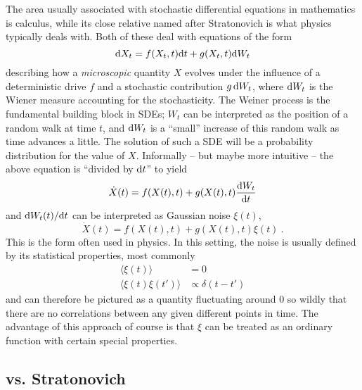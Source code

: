 The area usually associated with stochastic differential equations in mathematics is \Ito{} calculus, while its close relative named after Stratonovich is what physics typically deals with. Both of these deal with equations of the form
%
\begin{equation}
	\label{eqn:sde}
	\mathrm{d} X_t = f(X_t,t) \mathrm{d} t + g(X_t,t) \mathrm{d} W_t
\end{equation}
%
describing how a \emph{microscopic} quantity \(X\) evolves under the influence of a deterministic drive \(f\) and a stochastic contribution \(g\,\mathrm{d} W_t\), where \(\mathrm{d} W_t\) is the Wiener measure accounting for the stochasticity. The Weiner process is the fundamental building block in SDEs; \(W_t\) can be interpreted as the position of a random walk at time \(t\), and \(\mathrm{d} W_t\) is a ``small'' increase of this random walk as time advances a little. The solution of such a SDE will be a probability distribution for the value of \(X\).
Informally -- but maybe more intuitive -- the above equation is ``divided by \(\mathrm{d} t\)'' to yield
%
\begin{equation}
	\dot X(t) = f(X(t),t) + g(X(t),t)\frac{\mathrm{d} W_t}{\mathrm{d} t}
\end{equation}
%
and \(\mathrm{d} W_t(t)/\mathrm{d} t\) can be interpreted as Gaussian noise \(\xi(t)\),
\begin{equation}
	\dot X(t) = f(X(t),t) + g(X(t),t)\xi(t)~.
\end{equation}
%
This is the form often used in physics. In this setting, the noise is usually defined by its statistical properties, most commonly
\begin{align}
	\langle\xi(t)\rangle &= 0 \\
	\langle\xi(t)\xi(t')\rangle &\propto \delta(t-t')
\end{align}
%
and can therefore be pictured as a quantity fluctuating around \(0\) so wildly that there are no correlations between any given different points in time. The advantage of this approach of course is that \(\xi\) can be treated as an ordinary function with certain special properties.



\subsection{\Ito{} vs. Stratonovich}

